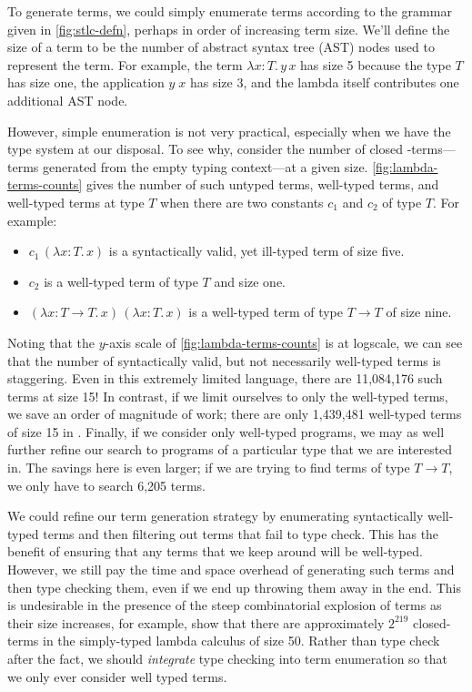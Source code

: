 

To generate \stlc{} terms, we could simply enumerate terms according to the grammar given in \autoref{fig:stlc-defn}, perhaps in order of increasing term size.
We'll define the size of a term to be the number of abstract syntax tree (AST) nodes used to represent the term.
For example, the term $λx{:}T.\,y\,x$ has size 5 because the type $T$ has size one, the application $y\;x$ has size 3, and the lambda itself contributes one additional AST node.

However, simple enumeration is not very practical, especially when we have the type system at our disposal.
To see why, consider the number of closed \stlc-terms---terms generated from the empty typing context---at a given size.
\autoref{fig:lambda-terms-counts} gives the number of such untyped terms, well-typed terms, and well-typed terms at type $T$ when there are two constants $c_1$ and $c_2$ of type $T$.
For example:
\begin{itemize}
  \item $c_1\,(λx{:}T.\,x)$ is a syntactically valid, yet ill-typed term of size five.
  \item $c_2$ is a well-typed term of type $T$ and size one.
  \item $(λx{:}T → T.\,x)\,(λx{:}T.\,x)$ is a well-typed term of type $T → T$ of size nine.
\end{itemize}

Noting that the $y$-axis scale of \autoref{fig:lambda-terms-counts} is at logscale, we can see that the number of syntactically valid, but not necessarily well-typed terms is staggering.
Even in this extremely limited language, there are 11,084,176 such terms at size 15!
In contrast, if we limit ourselves to only the well-typed terms, we save an order of magnitude of work; there are only 1,439,481 well-typed terms of size 15 in \stlc.
Finally, if we consider only well-typed programs, we may as well further refine our search to programs of a particular type that we are interested in.
The savings here is even larger; if we are trying to find terms of type $T → T$, we only have to search 6,205 terms.

We could refine our term generation strategy by enumerating syntactically well-typed terms and then filtering out terms that fail to type check.
This has the benefit of ensuring that any terms that we keep around will be well-typed.
However, we still pay the time and space overhead of generating such terms and then type checking them, even if we end up throwing them away in the end.
This is undesirable in the presence of the steep combinatorial explosion of terms as their size increases, for example, \citet{grygiel-jfp-2013} show that there are approximately $2^{219}$ closed-terms in the simply-typed lambda calculus of size 50.
Rather than type check after the fact, we should \emph{integrate} type checking into term enumeration so that we only ever consider well typed terms.


